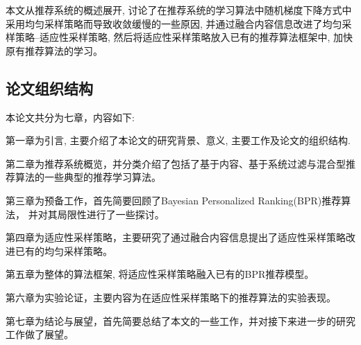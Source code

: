 本文从推荐系统的概述展开, 讨论了在推荐系统的学习算法中随机梯度下降方式中采用均匀采样策略而导致收敛缓慢的一些原因, 并通过融合内容信息改进了均匀采样策略--适应性采样策略, 然后将适应性采样策略放入已有的推荐算法框架中, 加快原有推荐算法的学习。




\subsection{论文组织结构}

 本论文共分为七章，内容如下: 

 第一章为引言, 主要介绍了本论文的研究背景、意义, 主要工作及论文的组织结构.
 
 第二章为推荐系统概览，并分类介绍了包括了基于内容、基于系统过滤与混合型推荐算法的一些典型的推荐学习算法。
 
 第三章为预备工作，首先简要回顾了Bayesian Personalized Ranking(BPR)推荐算法， 并对其局限性进行了一些探讨。
 
 第四章为适应性采样策略，主要研究了通过融合内容信息提出了适应性采样策略改进已有的均匀采样策略。
 
 第五章为整体的算法框架, 将适应性采样策略融入已有的BPR推荐模型。
 
 第六章为实验论证，主要内容为在适应性采样策略下的推荐算法的实验表现。
 
 第七章为结论与展望，首先简要总结了本文的一些工作，并对接下来进一步的研究工作做了展望。
